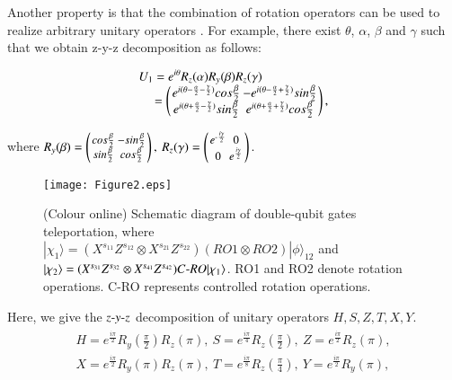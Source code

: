 \documentclass[aps,pra,showpacs,twocolumn,superscriptaddress]{revtex4-1}
\begin{document}
Another property is that the combination of rotation operators can be used to realize arbitrary unitary {operators \cite{2000MAN}}. For example, there exist $\theta$, $\alpha$, $\beta$ and $\gamma$ such that we obtain z-y-z decomposition as follows:
\begin{small}
\begin{eqnarray}
\setlength{\arraycolsep}{1.2pt}
\begin{array}{l}
\displaystyle U_1=e^{i\theta}R_z(\alpha)R_y(\beta)R_z(\gamma) \\
\displaystyle\quad \ =\left(
  \begin{array}{cc}
  e^{i(\theta-\frac{\alpha}{2}-\frac{\gamma}{2})}cos\frac{\beta}{2} & -e^{i(\theta-\frac{\alpha}{2}+\frac{\gamma}{2})}sin\frac{\beta}{2} \\
  e^{i(\theta+\frac{\alpha}{2}-\frac{\gamma}{2})}sin\frac{\beta}{2} & e^{i(\theta+\frac{\alpha}{2}+\frac{\gamma}{2})}cos\frac{\beta}{2}\\
  \end{array}
\right),
\end{array}
\end{eqnarray}
\end{small}
where $\small
\setlength{\arraycolsep}{1.2pt}
R_y(\beta)=\left(
  \begin{array}{cc}
 cos\frac{\beta}{2} &-sin\frac{\beta}{2} \\
  sin\frac{\beta}{2} &  cos\frac{\beta}{2}\\
  \end{array}
\right),\
R_z(\gamma)=\left(
  \begin{array}{cc}
  e^{\textnormal{-}\frac{i\gamma}{2}} &0 \\
  0 & e^{\frac{i\gamma}{2}}\\
  \end{array}
\right).$

\begin{figure*}[!htp]
  \centering
  \texttt{[image: Figure2.eps]}
  \caption{(Colour online) Schematic diagram of double-qubit gates teleportation, where $|\chi_1\rangle=(X^{s_{11}}Z^{s_{12}}\otimes X^{s_{21}}Z^{s_{22}})(RO1\otimes RO2)|\phi\rangle_{12}$ and $|\chi_2\rangle=(X^{s_{31}}Z^{s_{32}}\otimes X^{s_{41}}Z^{s_{42}})C\textnormal{-}RO|\chi_1\rangle$. RO1 and RO2 denote rotation operations. C-RO represents controlled rotation operations.}\label{F2}
\end{figure*}

Here, we give the $z\textnormal{-}y\textnormal{-}z$ decomposition of unitary operators $H, S, Z, T, X, Y$.
\begin{eqnarray}
\begin{array}{l}
\displaystyle H=e^{\frac{i \pi}{2}}R_y(\frac{\pi}{2})R_z(\pi),\ S=e^{\frac{i \pi}{4}}R_z(\frac{\pi}{2}),\ Z=e^{\frac{i \pi}{2}}R_z(\pi), \\
\displaystyle X=e^{\frac{i \pi}{2}}R_y(\pi)R_z(\pi),\ T=e^{\frac{i \pi}{8}} R_z(\frac{\pi}{4}), \ Y=e^{\frac{i\pi}{2}}R_y(\pi),
\end{array}
\end{eqnarray}
\end{document}
